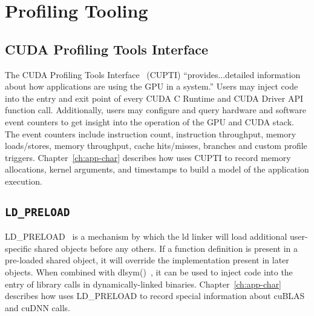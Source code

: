 %
%
%
\section{Profiling Tooling}

\subsection{CUDA Profiling Tools Interface}
\label{sec:cupti}

The CUDA Profiling Tools Interface~\cite{nvidia2017cupti} (CUPTI) ``provides...detailed information about how applications are using the GPU in a system.''
Users may inject code into the entry and exit point of every CUDA C Runtime and CUDA Driver API function call.
Additionally, users may configure and query hardware and software event counters to get insight into the operation of the GPU and CUDA stack.
The event counters include instruction count, instruction throughput, memory loads/stores, memory throughput, cache hits/misses, branches and custom profile triggers.
Chapter~\ref{ch:app-char} describes how  uses CUPTI to record memory allocations, kernel arguments, and timestamps to build a model of the application execution.

\subsection{\texttt{LD\_PRELOAD}}
\label{sec:ldpreload}

LD\_PRELOAD~\cite{kerrisk2017ld} is a mechanism by which the ld linker will load additional user-specific shared objects before any others.
If a function definition is present in a pre-loaded shared object, it will override the implementation present in later objects.
When combined with dlsym()~\cite{kerrisk2017dlysm}, it can be used to inject code into the entry of library calls in dynamically-linked binaries.
Chapter~\ref{ch:app-char} describes how  uses LD\_PRELOAD to record special information about cuBLAS and cuDNN calls.

\cite{kerrisk2017ld}

